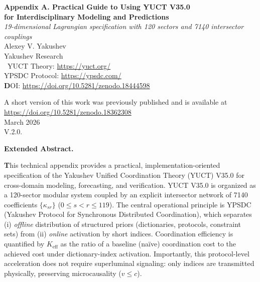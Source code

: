 \documentclass[13pt,a4paper]{article}
\newcommand{\Keff}{K_{\mathrm{eff}}}
\begin{document}
	
	\begin{titlepage}
		\begin{center}
			\vspace*{0.2cm}
			{\Huge\textbf{Appendix A. 
					Practical Guide to Using YUCT V35.0\\
					for Interdisciplinary Modeling and Predictions}}\\[0.8cm]
			
			{\Large\textit{19-dimensional Lagrangian specification with 120 sectors and 7140 intersector couplings}}\\[1.2cm]
			
			{\Large Alexey V. Yakushev}\\[0.3cm]
			{\large Yakushev Research}\\\
	YUCT Theory: \url{https://yuct.org/}\\
YPSDC Protocol: \url{https://ypsdc.com/}\\


\vspace{2cm}
\textbf DOI: \url{https://doi.org/10.5281/zenodo.18444598}\\

\vspace{1cm}

\vspace{0cm}
\large 
A short version of this work was previously published and is available at\\ \url{https://doi.org/10.5281/zenodo.18362308}\\
\vspace{1cm}
March 2026 \\ \large V.2.0.
			
			\begin{minipage}{0.92\textwidth}
				\begin{center}\large\textbf{Extended Abstract.} \\
				\end{center}
				\large\textbf This technical appendix provides a practical, implementation-oriented specification of the Yakushev Unified Coordination Theory (YUCT) V35.0 for cross-domain modeling, forecasting, and verification. YUCT V35.0 is organized as a 120-sector modular system coupled by an explicit intersector network of 7140 coefficients $\{\kappa_{sr}\}$ ($0\le s<r\le 119$). The central operational principle is YPSDC (Yakushev Protocol for Synchronous Distributed Coordination), which separates (i) \emph{offline} distribution of structured priors (dictionaries, protocols, constraint sets) from (ii) \emph{online} activation by short indices. Coordination efficiency is quantified by $\Keff$ as the ratio of a baseline (na\"ive) coordination cost to the achieved cost under dictionary-index activation. Importantly, this protocol-level acceleration does not require superluminal signaling: only indices are transmitted physically, preserving microcausality ($v\le c$).
				

\end{minipage}
\end{center}
\end{titlepage}
\end{document}
